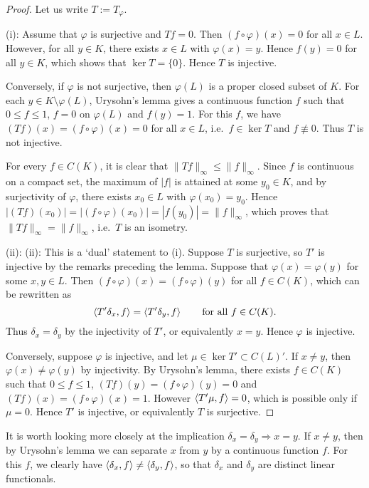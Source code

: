 \begin{proof}
	Let us write $T := T_\varphi$.
	
	(i): Assume that $\varphi$ is surjective and $Tf = 0$. Then $(f\circ\varphi)(x)=0$ for all $x\in L$. However, for all $y\in K$, there exists $x\in L$ with $\varphi(x)=y$. Hence $f(y)=0$ for all $y\in K$, which shows that $\ker T = \{0\}$. Hence $T$ is injective.
	
	Conversely, if $\varphi$ is not surjective, then $\varphi(L)$ is a proper closed subset of $K$. For each $y\in K \setminus \varphi(L)$, Urysohn's lemma gives a continuous function $f$ such that $0 \le f \le 1$, $f=0$ on $\varphi(L)$ and $f(y)=1$. For this $f$, we have $(Tf)(x) = (f\circ\varphi)(x) = 0$ for all $x\in L$, i.e.\ $f \in \ker T$ and $f \not\equiv 0$. Thus $T$ is not injective.
	
	For every $f \in C(K)$, it is clear that $\|Tf\|_\infty \le \|f\|_\infty$. Since $f$ is continuous on a compact set, the maximum of $|f|$ is attained at some $y_0\in K$, and by surjectivity of $\varphi$, there exists $x_0\in L$ with $\varphi(x_0)=y_0$. Hence $|(Tf)(x_0)| = |(f\circ\varphi)(x_0)| = |f(y_0)| = \|f\|_\infty$, which proves that $\|Tf\|_\infty = \|f\|_\infty$, i.e.\ $T$ is an isometry.
	
	(ii): (ii): This is a `dual' statement to (i). Suppose $T$ is surjective, so $T'$ is injective by the remarks preceding the lemma. Suppose that $\varphi(x)=\varphi(y)$ for some $x,y \in L$. Then $(f\circ\varphi)(x)=(f\circ\varphi)(y)$ for all $f\in C(K)$, which can be rewritten as
	\begin{equation*}
		\braket{T'\delta_x,f} = \braket{T'\delta_y,f} \qquad \text{for all } f \in C(K).
	\end{equation*}
	Thus $\delta_x = \delta_y$ by the injectivity of $T'$, or equivalently $x=y$. Hence $\varphi$ is injective.
	
	Conversely, suppose $\varphi$ is injective, and let $\mu\in\ker T' \subset C(L)'$. If $x\ne y$, then $\varphi(x)\ne \varphi(y)$ by injectivity. By Urysohn's lemma, there exists $f\in C(K)$ such that $0\le f\le 1$, $(Tf)(y)=(f\circ\varphi)(y)=0$ and $(Tf)(x)=(f\circ\varphi)(x)=1$. However $\braket{T'\mu, f} = 0$, which is possible only if $\mu=0$. Hence $T'$ is injective, or equivalently $T$ is surjective.
\end{proof}

\begin{remark}
	It is worth looking more closely at the implication $\delta_x = \delta_y \Rightarrow x=y$. If $x\ne y$, then by Urysohn's lemma we can separate $x$ from $y$ by a continuous function $f$. For this $f$, we clearly have $\braket{\delta_x,f} \ne \braket{\delta_y,f}$, so that $\delta_x$ and $\delta_y$ are distinct linear functionals.
\end{remark}

